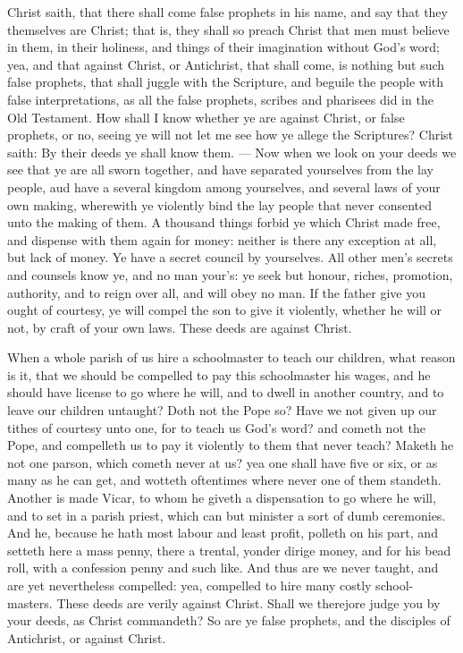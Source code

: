 Christ saith, that there shall come false prophets
in his name, and say that they themselves 
are Christ; that is, they shall so preach Christ 
that men must believe in them, in their holiness,
and things of their imagination without God's word; 
yea, and that against Christ, or Antichrist, that 
shall come, is nothing but such false prophets,
that shall juggle with the Scripture, and 
beguile the people with false interpretations, as 
all the false prophets, scribes and pharisees did 
in the Old Testament. How shall I know whether
ye are against Christ, or false prophets, or 
no, seeing ye will not let me see how ye allege 
the Scriptures? Christ saith: By their deeds 
ye shall know them. — Now when we look on your 
deeds we see that ye are all sworn together, and 
have separated yourselves from the lay people, 
aud have a several kingdom among yourselves, 
and several laws of your own making, wherewith 
ye violently bind the lay people that never consented
unto the making of them. A thousand 
things forbid ye which Christ made free, and 
dispense with them again for money: neither is 
there any exception at all, but lack of money. 
Ye have a secret council by yourselves. All 
other men's secrets and counsels know ye, and no 
man your's: ye seek but honour, riches, promotion,
authority, and to reign over all, and will obey 
no man. If the father give you ought of courtesy,
ye will compel the son to give it violently, 
whether he will or not, by craft of your own 
laws. These deeds are against Christ.

When a whole parish of us hire a schoolmaster
to teach our children, what reason is it, 
that we should be compelled to pay this schoolmaster
his wages, and he should have license to 
go where he will, and to dwell in another country, 
and to leave our children untaught? Doth not 
the Pope so? Have we not given up our tithes 
of courtesy unto one, for to teach us God's 
word? and cometh not the Pope, and compelleth 
us to pay it violently to them that never teach? 
Maketh he not one parson, which cometh never 
at us? yea one shall have five or six, or as many 
as he can get, and wotteth oftentimes where 
never one of them standeth. Another is made 
Vicar, to whom he giveth a dispensation to go 
where he will, and to set in a parish priest, which 
can but minister a sort of dumb ceremonies. 
And he, because he hath most labour and least 
profit, polleth on his part, and setteth here a mass 
penny, there a trental, yonder dirige money,
and for his bead roll, with a confession penny and 
such like. And thus are we never taught, and 
are yet nevertheless compelled: yea, compelled 
to hire many costly school-masters. These 
deeds are verily against Christ. Shall we therejore
judge you by your deeds, as Christ commandeth?
So are ye false prophets, and the 
disciples of Antichrist, or against Christ. 

